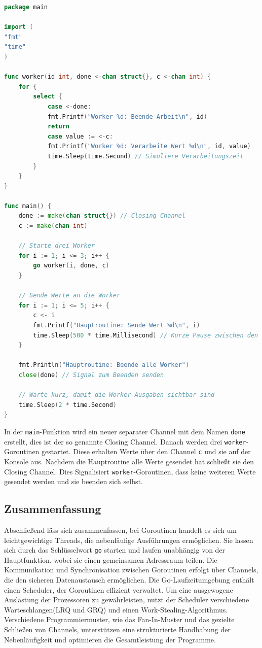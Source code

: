 \documentclass[fontsize=12pt,paper=a4,twoside=semi,parskip=half-,headsepline,headinclude]{scrreprt}
\begin{document}
\begin{lstlisting}[language=Go,extendedchars=true]
package main

import (
"fmt"
"time"
)

func worker(id int, done <-chan struct{}, c <-chan int) {
	for {
		select {
			case <-done:
			fmt.Printf("Worker %d: Beende Arbeit\n", id)
			return
			case value := <-c:
			fmt.Printf("Worker %d: Verarbeite Wert %d\n", id, value)
			time.Sleep(time.Second) // Simuliere Verarbeitungszeit
		}
	}
}

func main() {
	done := make(chan struct{}) // Closing Channel
	c := make(chan int)
	
	// Starte drei Worker
	for i := 1; i <= 3; i++ {
		go worker(i, done, c)
	}
	
	// Sende Werte an die Worker
	for i := 1; i <= 5; i++ {
		c <- i
		fmt.Printf("Hauptroutine: Sende Wert %d\n", i)
		time.Sleep(500 * time.Millisecond) // Kurze Pause zwischen den Sendungen
	}
	
	fmt.Println("Hauptroutine: Beende alle Worker")
	close(done) // Signal zum Beenden senden
	
	// Warte kurz, damit die Worker-Ausgaben sichtbar sind
	time.Sleep(2 * time.Second)
}
\end{lstlisting}

In der \texttt{main}-Funktion wird ein neuer separater Channel mit dem Namen \texttt{done} erstellt, dies ist der so genannte Closing Channel. Danach werden drei \texttt{worker}-Goroutinen gestartet. Diese erhalten Werte über den Channel \texttt{c} und sie auf der Konsole aus. Nachdem die Hauptroutine alle Werte gesendet hat schließt sie den Closing Channel. Dies Signalisiert \texttt{worker}-Goroutinen, dass keine weiteren Werte gesendet werden und sie beenden sich selbst.

\subsection{Zusammenfassung}

Abschließend läss sich zusammenfassen, bei Goroutinen handelt es sich um leichtgewichtige Threads, die nebenläufige Ausführungen ermöglichen. Sie lassen sich durch das Schlüsselwort \texttt{go} starten und laufen unabhängig von der Hauptfunktion, wobei sie einen gemeinsamen Adressraum teilen. Die Kommunikation und Synchronisation zwischen Goroutinen erfolgt über Channels, die den sicheren Datenaustausch ermöglichen. Die Go-Laufzeitumgebung enthält einen Scheduler, der Goroutinen effizient verwaltet. Um eine ausgewogene Auslastung der Prozessoren zu gewährleisten, nutzt der Scheduler verschiedene Warteschlangen(LRQ und GRQ) und einen Work-Stealing-Algorithmus. Verschiedene Programmiermuster, wie das Fan-In-Muster und das gezielte Schließen von Channels, unterstützen eine strukturierte Handhabung der Nebenläufigkeit und optimieren die Gesamtleistung der Programme.
\end{document}
